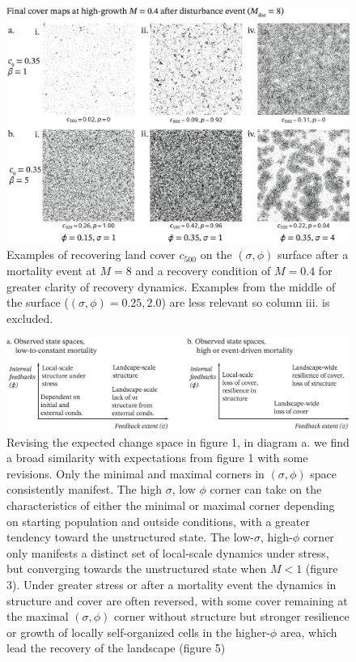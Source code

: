 \documentclass[10pt]{article}
\begin{document}
\begin{figure}
 	\begin{center}
		\includegraphics{f6_cartes.png}
	\end{center}
		\caption{Examples of recovering land cover $c_{500}$ on the $(\sigma,\phi)$ surface after a mortality event at $M = 8$ and a recovery condition of $M = 0.4$ for greater clarity of recovery dynamics. Examples from the middle of the surface ($(\sigma,\phi) = 0.25,2.0$) are less relevant so column iii. is excluded.}
\end{figure}

\begin{figure}
 	\begin{center}
		\includegraphics{f7_post-experiment.png}
	\end{center}
		\caption{Revising the expected change space in figure 1, in diagram a. we find a broad similarity with expectations from figure 1 with some revisions. Only the minimal and maximal corners in $(\sigma,\phi)$ space consistently manifest. The high $\sigma$, low $\phi$ corner can take on the characteristics of either the minimal or maximal corner depending on starting population and outside conditions, with a greater tendency toward the unstructured state. The low-$\sigma$, high-$\phi$ corner only manifests a distinct set of local-scale dynamics under stress, but converging towards the unstructured state when $M < 1$ (figure 3). Under greater stress or after a mortality event the dynamics in structure and cover are often reversed, with some cover remaining at the maximal $(\sigma,\phi)$ corner without structure but stronger resilience or growth of locally self-organized cells in the higher-$\phi$ area, which lead the recovery of the landscape (figure 5)}
\end{figure}
\end{document}
